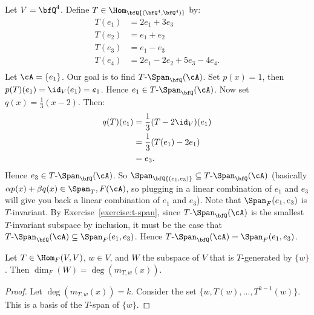     \begin{example}
        Let $V = \bfQ^4$. Define $T \in \Hom_\bfQ{(\bfQ^4,\bfQ^4)}$ by:
            \begin{equation*}
            \begin{split}
                T(e_1) &= 2e_1 + 3e_3 \\
                T(e_2) &= e_1 + e_2 \\
                T(e_3) &= e_1 - e_3 \\
                T(e_4) &= 2e_1 - 2e_2 + 5e_3 - 4e_4.\\
            \end{split}
            \end{equation*}
        Let $\cA = \{e_1\}$. Our goal is to find $T\text{-}\Span_{\bfQ}(\cA)$. Set $p(x) = 1$, then $p(T)(e_1) = \id_V(e_1) =e_1$. Hence $e_1 \in T\text{-}\Span_{\bfQ}(\cA)$. Now set $q(x) = \frac{1}{3}(x-2)$. Then:
            \begin{equation*}
            \begin{split}
                q(T)(e_1)
                & = \frac{1}{3}(T-2\id_V)(e_1)\\
                & = \frac{1}{3}(T(e_1) - 2e_1) \\
                & = e_3.
            \end{split}
            \end{equation*}
        Hence $e_3 \in T\text{-}\Span_{\bfQ}(\cA)$. So $\Span_\bfQ{(e_1,e_3)} \subseteq T\text{-}\Span_{\bfQ}(\cA)$ (basically $\alpha p(x) + \beta q(x) \in \Span_T,F(\cA)$, so plugging in a linear combination of $e_1$ and $e_3$ will give you back a linear combination of $e_1$ and $e_3$). Note that $\Span_F(e_1,e_3)$ is $T$-invariant. By Exercise~\ref{exercise:t-span}, since $T\text{-}\Span_{\bfQ}(\cA)$ is the smallest $T$-invariant subspace by inclusion, it must be the case that $T\text{-}\Span_{\bfQ}(\cA) \subseteq \Span_F{(e_1,e_3)}$. Hence $T\text{-}\Span_{\bfQ}(\cA) = \Span_F{(e_1,e_3)}$.
    \end{example}

    \begin{lemma}\label{lemma:4.3.9}
        Let $T \in \Hom_F{(V,V)}$, $w \in V$, and $W$ the subspace of $V$ that is $T$-generated by $\{w\}$. Then $\dim_F{(W)} = \deg(m_{T,w}(x))$.
    \end{lemma}
        \begin{proof}
            Let $\deg(m_{T,w}(x)) = k$. Consider the set $\{w,T(w),...,T^{k-1}(w)\}$. This is a basis of the $T$-span of $\{w\}$.
        \end{proof}

